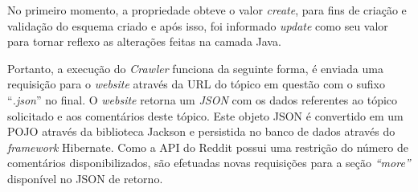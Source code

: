 No primeiro momento, a propriedade obteve o valor \textit{create}, para fins de
criação e validação do esquema criado e após isso, foi informado \textit{update}
como seu valor para tornar reflexo as alterações feitas na camada Java.

Portanto, a execução do \textit{Crawler} funciona da seguinte forma, é enviada
uma requisição para o \textit{website} através da URL do tópico em questão com o
sufixo ``\textit{.json}'' no final. O \textit{website} retorna um
\textit{JSON} com os dados referentes ao tópico solicitado e aos comentários
deste tópico. Este objeto \ac{JSON} é convertido em um \ac{POJO} através da
biblioteca Jackson e persistida no banco de dados através do \textit{framework}
Hibernate. Como a API do Reddit possui uma restrição do número de comentários
disponibilizados, são efetuadas novas requisições para a seção \textit{``more''}
disponível no \ac{JSON} de retorno.

